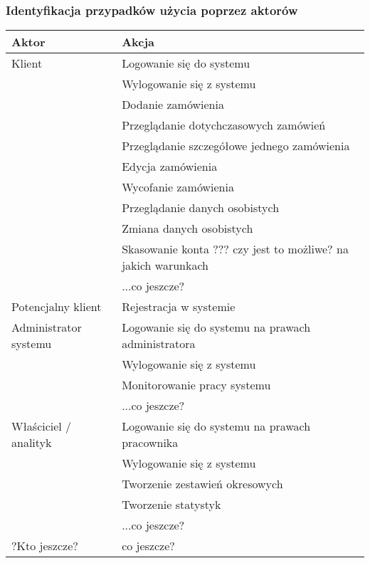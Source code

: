 \documentclass[10pt,a4paper,titlepage]{article} %
\begin{document}
		\subsubsection{Identyfikacja przypadków użycia poprzez aktorów}
		\begin {center}
		\begin{tabular}{|p{4cm}|p{8cm}|}
		  \hline
		  {\bf Aktor} & {\bf Akcja} \\ \hline
		  \hline
		  Klient & Logowanie się do systemu \\ \cline{2-2}
		  & Wylogowanie się z systemu \\ \cline{2-2}
		  & Dodanie zamówienia \\ \cline{2-2}
		  & Przeglądanie dotychczasowych zamówień \\ \cline{2-2}
		  & Przeglądanie szczegółowe jednego zamówienia \\ \cline{2-2}
		  & Edycja zamówienia \\ \cline{2-2}
		  & Wycofanie zamówienia \\ \cline{2-2}
		  & Przeglądanie danych osobistych \\ \cline{2-2}
		  & Zmiana danych osobistych \\ \cline{2-2}
		  & Skasowanie konta ??? czy jest to możliwe? na jakich warunkach \\ \cline{2-2}
		  & ...co jeszcze? \\ \cline{2-2}
		  \hline
		  Potencjalny klient & Rejestracja w systemie \\ \cline{2-2}
		  \hline
		  Administrator systemu & Logowanie się do systemu na prawach administratora \\ \cline{2-2}
		  & Wylogowanie się z systemu \\ \cline{2-2}
		  & Monitorowanie pracy systemu \\ \cline{2-2}
		  & ...co jeszcze? \\ \cline{2-2}
		  \hline
		  Właściciel / analityk & Logowanie się do systemu na prawach pracownika \\ \cline{2-2}
		  & Wylogowanie się z systemu \\ \cline{2-2}
		  & Tworzenie zestawień okresowych \\ \cline{2-2}
		  & Tworzenie statystyk \\ \cline{2-2}
		  & ...co jeszcze? \\ \cline{2-2}
		  \hline
		  ?Kto jeszcze? & co jeszcze? \\ \cline{2-2}
		  \hline
		\end{tabular}
		\end{center}
\end{document}
